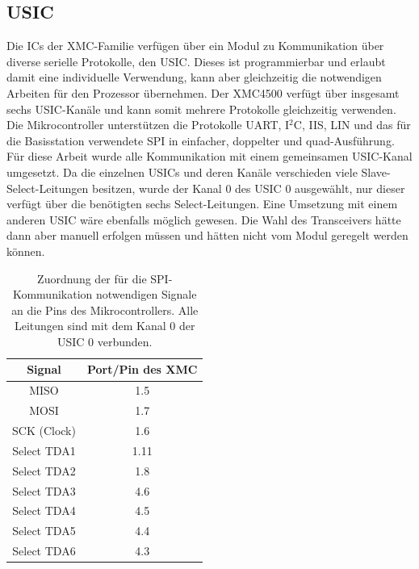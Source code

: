 \subsection{USIC}
Die \acp{IC} der XMC-Familie verfügen über ein Modul zu Kommunikation über diverse serielle Protokolle, den \acf{USIC}. Dieses ist programmierbar und erlaubt damit eine individuelle Verwendung, kann aber gleichzeitig die notwendigen Arbeiten für den Prozessor übernehmen. Der XMC4500 verfügt über insgesamt sechs \ac{USIC}-Kanäle und kann somit mehrere Protokolle gleichzeitig verwenden. Die Mikrocontroller unterstützen die  Protokolle UART, I$^{2}$C, IIS, LIN und das für die Basisstation verwendete SPI in einfacher, doppelter und quad-Ausführung. Für diese Arbeit wurde alle Kommunikation mit einem gemeinsamen \acs{USIC}-Kanal umgesetzt. Da die einzelnen \acp{USIC} und deren Kanäle verschieden viele Slave-Select-Leitungen besitzen, wurde der Kanal $0$ des \ac{USIC} $0$ ausgewählt, nur dieser verfügt über die benötigten sechs Select-Leitungen. Eine Umsetzung mit einem anderen USIC wäre ebenfalls möglich gewesen. Die Wahl des Transceivers hätte dann aber manuell erfolgen müssen und hätten nicht vom Modul geregelt werden können.
\begin{table}
	\centering
	\begin{tabular}{cc}
		
		Signal & Port/Pin des XMC \\ 
		\hline 
		MISO & 1.5 \\  
		MOSI &  1.7\\ 
		SCK (Clock) & 1.6 \\ 
		Select TDA1 & 1.11 \\  
		Select TDA2 &1.8  \\ 
		Select TDA3& 4.6 \\  
		Select TDA4& 4.5 \\  
		Select TDA5& 4.4 \\ 
		Select TDA6& 4.3 \\ 
	\end{tabular} 
	\caption[Zuordnung SPI-Signale an die Pins des Mikrocontrollers.]{Zuordnung der für die SPI-Kommunikation notwendigen Signale an die Pins des Mikrocontrollers. Alle Leitungen sind mit dem Kanal $0$ der USIC $0$ verbunden.}
	\label{tab:SPI}
\end{table}


